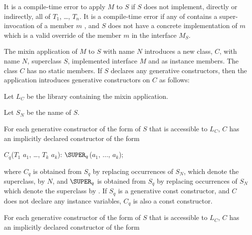 \documentclass[makeidx]{article}
\begin{document}
\LMHash{}%
It is a compile-time error to apply $M$ to $S$ if $S$ does not implement,
directly or indirectly, all of $T_1$, \ldots, $T_n$.
It is a compile-time error if any of  contains a
super-invocation of a member $m$ , and $S$ does not have a concrete
implementation of $m$ which is a valid override of the member $m$ in
the interface $M_S$. 

\LMHash{}%
The mixin application of $M$ to $S$ with name $N$ introduces a new
class, $C$, with name $N$, superclass $S$,
implemented interface $M$
and  as instance members.
The class $C$ has no static members.
If $S$ declares any generative constructors, then the application
introduces generative constructors on $C$ as follows:

\LMHash{}%
Let $L_C$ be the library containing the mixin application.

Let $S_N$ be the name of $S$.

For each generative constructor of the form
of $S$ that is accessible to $L_C$, $C$ has
an implicitly declared constructor of the form

\begin{normativeDartCode}
$C_q$($T_{1}$ $a_{1}$, \ldots, $T_{k}$ $a_{k}$): $\SUPER_q$($a_{1}$, $\ldots$, $a_{k}$);
\end{normativeDartCode}

\noindent
where $C_q$ is obtained from $S_q$ by replacing occurrences of $S_N$,
which denote the superclass, by $N$, and $\SUPER_q$ is obtained from $S_q$ by
replacing occurrences of $S_N$ which denote the superclass by \SUPER.
If $S_q$ is a generative const constructor, and $C$ does not declare any
instance variables, $C_q$ is also a const constructor.

\LMHash{}%
For each generative constructor of the form
of $S$ that is accessible to $L_C$, $C$ has
an implicitly declared constructor of the form
\end{document}
